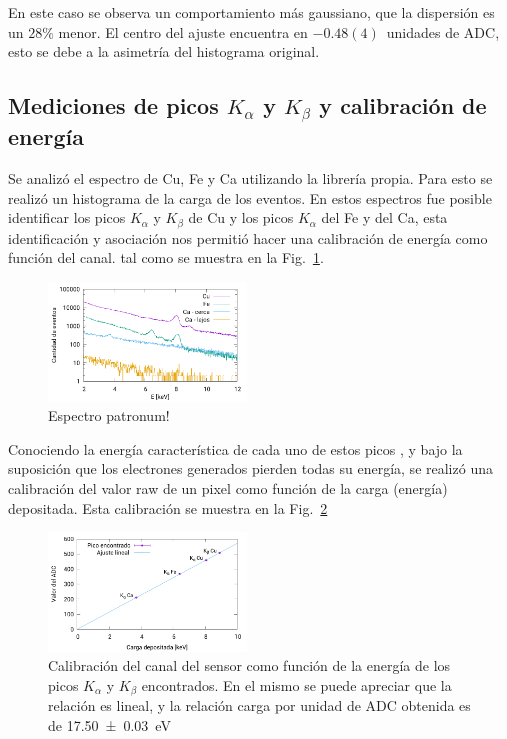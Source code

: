 \documentclass[twoside,twocolumn]{article}
\begin{document}
      En este caso se observa un comportamiento más gaussiano, que la dispersión es un $28\%$ menor.
      El centro del ajuste encuentra en $-0.48(4)$~unidades de ADC, esto se debe a la asimetría del histograma original.
      

    \subsection{Mediciones de picos $K_{\alpha}$ y $K_{\beta}$ y calibración de energía}\label{sec:results:peaks}
      Se analizó el espectro de Cu, Fe y Ca utilizando la librería propia.
      Para esto se realizó un histograma de la carga de los eventos.
      En estos espectros fue posible identificar los picos $K_{\alpha}$ y $K_{\beta}$ de Cu y los picos $K_{\alpha}$ del Fe y del Ca,
      esta identificación y asociación nos permitió hacer una calibración de energía como función del canal.
      tal como se muestra en la Fig.~\ref{fig:spectrum_x-ray}.

      \begin{figure}[h]
        \includegraphics[width=0.47\textwidth]{figures/x-ray_spectrum.pdf}
        \caption{Espectro patronum!} %
        \label{fig:spectrum_x-ray}
      \end{figure}

      Conociendo la energía característica de cada uno de estos picos \cite{thompson2016xray},
      y bajo la suposición que los electrones generados pierden todas su energía, %
      se realizó una calibración del valor raw de un pixel como función de la carga (energía) depositada.
      Esta calibración se muestra en la Fig.~\ref{fig:x-ray_calibration}

      \begin{figure}[h]
        \includegraphics[width=0.47\textwidth]{figures/x-ray_calibration}
        \caption{Calibración del canal del sensor como función de la energía de
          los picos $K_{\alpha}$ y $K_{\beta}$ encontrados.
          En el mismo se puede apreciar que la relación es lineal,
          y la relación carga por unidad de ADC obtenida es de \SI{17.50(3)}{\eV}
        }
        \label{fig:x-ray_calibration}
      \end{figure}
\end{document}
